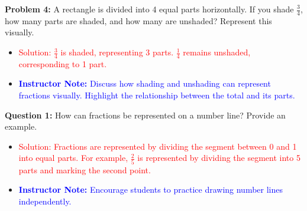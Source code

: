\documentclass[12pt]{article}
\begin{document}
\vspace{1em}
\begin{tcolorbox}[colframe=black!60, colback=white, 
coltitle=black, colbacktitle=black!15, fonttitle=\bfseries\Large, 
title=Independent Practice Continued, halign title=center, left=10pt, right=10pt, top=10pt, bottom=15pt]
\textbf{Problem 4:} A rectangle is divided into 4 equal parts horizontally. If you shade \( \frac{3}{4} \), how many parts are shaded, and how many are unshaded? Represent this visually.
\begin{center}
\end{center}

\begin{itemize}
    \item \textcolor{red}{Solution: \( \frac{3}{4} \) is shaded, representing 3 parts. \( \frac{1}{4} \) remains unshaded, corresponding to 1 part.}
    \item \textcolor{blue}{\textbf{Instructor Note:} Discuss how shading and unshading can represent fractions visually. Highlight the relationship between the total and its parts.}
\end{itemize}

\end{tcolorbox}


\vspace{3 cm}

\begin{tcolorbox}[colframe=black!60, colback=white, 
coltitle=black, colbacktitle=black!15, fonttitle=\bfseries\Large, 
title=Exit Ticket with Solutions, halign title=center, left=10pt, right=10pt, top=10pt, bottom=15pt]
\textbf{Question 1:} How can fractions be represented on a number line? Provide an example.
\begin{itemize}
    \item \textcolor{red}{Solution: Fractions are represented by dividing the segment between 0 and 1 into equal parts. For example, \( \frac{2}{5} \) is represented by dividing the segment into 5 parts and marking the second point.}
    \item \textcolor{blue}{\textbf{Instructor Note:} Encourage students to practice drawing number lines independently.}
\end{itemize}
\end{tcolorbox}
\end{document}
